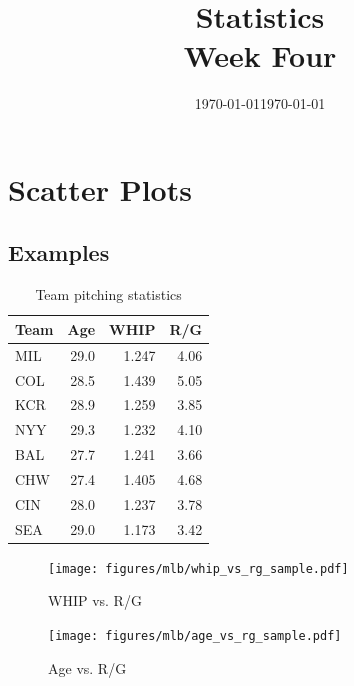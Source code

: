 \documentclass[landscape]{exam}
\author{}
\date{\today}
\title{Statistics \\ Week Four}
\date{\today}
\author{}
\begin{document}
\maketitle
\tableofcontents

  \section{Scatter Plots}

  \subsection{Examples} %
  \begin{table}[ht]
    \centering
    \begin{tabular}{lrrr}
      \toprule
      Team & Age  & WHIP  & R/G \\
      \midrule
      MIL  & 29.0 & 1.247 & 4.06 \\
      COL  & 28.5 & 1.439 & 5.05 \\
      KCR  & 28.9 & 1.259 & 3.85 \\
      NYY  & 29.3 & 1.232 & 4.10 \\
      BAL  & 27.7 & 1.241 & 3.66 \\
      CHW  & 27.4 & 1.405 & 4.68 \\
      CIN  & 28.0 & 1.237 & 3.78 \\
      SEA  & 29.0 & 1.173 & 3.42 \\
      \bottomrule
    \end{tabular}
    \caption{Team pitching statistics}
  \end{table}

  \begin{figure}[H]
    \centering
    \texttt{[image: figures/mlb/whip\_vs\_rg\_sample.pdf]}
    \caption{WHIP vs. R/G}
  \end{figure}

  \begin{figure}[H]
    \centering
    \texttt{[image: figures/mlb/age\_vs\_rg\_sample.pdf]}
    \caption{Age vs. R/G}
  \end{figure}
\end{document}
